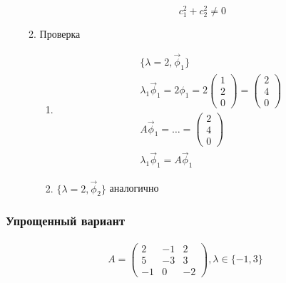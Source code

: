 \documentclass{article}
\begin{document}
\begin{enumerate}
\begin{enumerate}
\[			c_1^2 + c_2^2 \ne 0
		\]
		\item Проверка
		\begin{enumerate}
			\item \begin{gather*}
				\{ \lambda = 2, \vec{\phi}_1 \} \\
				\lambda_1 \vec{\phi}_1 = 2\phi_1 = 2 \begin{pmatrix}
					1 \\ 2 \\ 0
				\end{pmatrix} = \begin{pmatrix}
					2 \\ 4 \\ 0
				\end{pmatrix} \\
				A \vec{\phi}_1 = \dots = \begin{pmatrix}
					2 \\ 4 \\ 0
				\end{pmatrix} \\
				\lambda_1 \vec{\phi}_1 = A \vec{\phi}_1 
			\end{gather*}
			\item $\{ \lambda = 2, \vec{\phi}_2 \}$ аналогично
		\end{enumerate}
	\end{enumerate}
\end{enumerate}

\subsubsection{Упрощенный вариант}

\begin{gather*}
	A = \begin{pmatrix}
		2 & -1 & 2 \\
		5 & -3 & 3 \\
		-1 & 0 & -2
	\end{pmatrix},
	\lambda \in \{ -1, 3 \}
\end{gather*}
\end{document}
